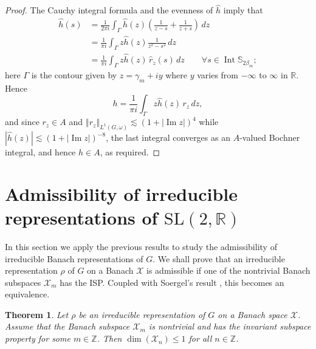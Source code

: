 \documentclass[12pt,a4paper]{amsart}
\newtheorem{thm}{Theorem}[section]
\theoremstyle{definition}
\theoremstyle{remark}
\numberwithin{equation}{section}
\newcommand{\norm}[1]{\left\Vert#1\right\Vert}
\newcommand{\Int}{\operatorname{Int}}
\newcommand{\R}{\mathbb{R}}
\newcommand{\Z}{\mathbb{Z}}
\newcommand{\Ban}{\mathcal{X}}
\renewcommand{\Im}{\operatorname{Im}}
\newcommand{\Strip}{\mathbb{S}}
\newcommand{\rep}{\rho}
\newcommand{\var}{s}
\newcommand{\funzz}{h}
\begin{document}
\begin{proof}
The Cauchy integral formula and the evenness of $\hat \funzz$ imply that
\[
\begin{aligned}
\hat \funzz(\var)  
&= \frac{1}{2\pi i} \int_{\Gamma} \hat \funzz(z) \left(\frac{1}{ z - \var} + \frac{1}{z + \var }\right) \,dz \\
&= \frac{1}{\pi i} \int_\Gamma z \hat \funzz(z) \frac{1}{z^2 - \var^2 }  \,dz \\
&= \frac{1}{\pi i} \int_\Gamma z \hat \funzz(z) \, \hat r_{z}(\var)  \,dz 
\qquad\forall s \in \Int \Strip_{2\beta_m};
\end{aligned}
\]
here $\Gamma$ is the contour given by $z = \gamma_m +iy$ where $y$ varies from $-\infty$ to $\infty$ in $\R$.
Hence
\[
\funzz=\frac{1}{\pi i} \int_\Gamma z \hat \funzz(z) \,  r_{z}  \,dz ,
\]
and since $r_z \in A$ and $\norm{r_z}_{L^1(G,\omega)} \lesssim (1 + |\Im z|)^4$ while $|\hat \funzz(z)| \lesssim (1 + |\Im z|)^{-8}$, the last integral
converges as an $A$-valued Bochner integral, and hence  $\funzz \in A$, as required.
\end{proof}

\section{Admissibility of irreducible  representations of $\mathrm{SL}(2,\R)$}

In this section we apply the previous results to study the admissibility of irreducible Banach representations of $G$. We shall prove that an irreducible   representation $\rep$ of $G$ on a Banach $\Ban$ is admissible if one of the nontrivial  Banach subspaces $\Ban_m$ has the ISP.
Coupled with Soergel's result \cite{Soergel88}, this becomes an equivalence.

\begin{thm}
Let $\rep$ be an irreducible representation of $G$ on a Banach space $\Ban$.
Assume that the Banach subspace $\Ban_m$ is nontrivial and has the invariant subspace property for some $m \in \Z$.
Then $\dim(\Ban_{n}) \leq1$ for all $n \in \Z$.
\end{thm}
\end{document}
